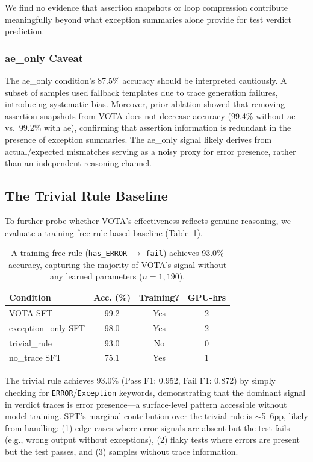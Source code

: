 \documentclass[11pt,a4paper]{article}
\begin{document}
We find no evidence that assertion snapshots or loop compression contribute meaningfully beyond what exception summaries alone provide for test verdict prediction.

\subsubsection{ae\_only Caveat}
\label{sec:ae_caveat}

The ae\_only condition's 87.5\% accuracy should be interpreted cautiously.
A subset of samples used fallback templates due to trace generation failures, introducing systematic bias.
Moreover, prior ablation showed that removing assertion snapshots from VOTA does not decrease accuracy (99.4\% without ae vs.\ 99.2\% with ae), confirming that assertion information is redundant in the presence of exception summaries.
The ae\_only signal likely derives from actual/expected mismatches serving as a noisy proxy for error presence, rather than an independent reasoning channel.

\subsection{The Trivial Rule Baseline}
\label{sec:trivial}

To further probe whether VOTA's effectiveness reflects genuine reasoning, we evaluate a training-free rule-based baseline (Table~\ref{tab:trivial}).

\begin{table}[t]
\centering
\small
\begin{tabular}{lccc}
\toprule
\textbf{Condition} & \textbf{Acc. (\%)} & \textbf{Training?} & \textbf{GPU-hrs} \\
\midrule
VOTA SFT & 99.2 & Yes & 2 \\
exception\_only SFT & 98.0 & Yes & 2 \\
trivial\_rule & 93.0 & No & 0 \\
no\_trace SFT & 75.1 & Yes & 1 \\
\bottomrule
\end{tabular}
\caption{A training-free rule (\texttt{has\_ERROR} $\to$ \texttt{fail}) achieves 93.0\% accuracy, capturing the majority of VOTA's signal without any learned parameters ($n=1{,}190$).}
\label{tab:trivial}
\end{table}

The trivial rule achieves 93.0\% (Pass F1: 0.952, Fail F1: 0.872) by simply checking for \texttt{ERROR}/\texttt{Exception} keywords, demonstrating that the dominant signal in verdict traces is error presence---a surface-level pattern accessible without model training.
SFT's marginal contribution over the trivial rule is $\sim$5--6pp, likely from handling: (1) edge cases where error signals are absent but the test fails (e.g., wrong output without exceptions), (2) flaky tests where errors are present but the test passes, and (3) samples without trace information.
\end{document}

